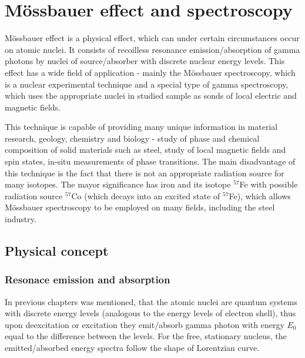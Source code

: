 
\chapter{Mössbauer effect and spectroscopy}
Mössbauer effect is a physical effect, which can under certain circumstances occur on atomic nuclei. It consists of recoilless resonance emission/absorption of gamma photons by nuclei of source/absorber with discrete nuclear energy levels. This effect has a wide field of application - mainly the Mössbauer spectroscopy, which is a nuclear experimental technique and a special type of gamma spectroscopy, which uses the appropriate nuclei in studied sample as sonds of local electric and magnetic fields. 

\par
This technique is capable of providing many unique information in material research, geology, chemistry and biology - study of phase and chemical composition of solid materials such as steel, study of local magnetic fields and spin states, in-situ measurements of phase transitions. The main disadvantage of this technique is the fact that there is not an appropriate radiation source for many isotopes. The mayor significance has iron and its isotope $^{57}$Fe with possible radiation source $^{57}$Co (which decays into an excited state of $^{57}$Fe), which allows Mössbauer spectroscopy to be employed on many fields, including the steel industry.

\section{Physical concept}

\subsection{Resonace emission and absorption}
In previous chapters was mentioned, that the atomic nuclei are quantum systems with discrete energy levels (analogous to the energy levels of electron shell), thus upon deexcitation or excitation they emit/absorb gamma photon with energy $E_0$ equal to the difference between the levels. For the free, stationary nucleus, the emitted/absorbed energy spectra follow the shape of Lorentzian curve. 

